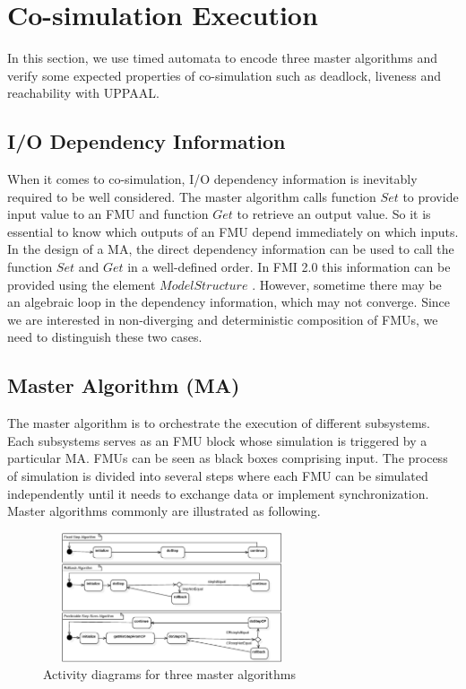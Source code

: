 \section{Co-simulation Execution}
\label{sec:ma}
In this section, we use timed automata to encode three master algorithms and verify some expected properties of co-simulation such as deadlock, liveness and reachability with UPPAAL.
\subsection{I/O Dependency Information}
When it comes to co-simulation, I/O dependency information \cite{BromanBGLMTW13} is inevitably required to be well considered. The master algorithm calls function $Set$ to provide input value to an FMU and function $Get$ to retrieve an output value. So it is essential to know which outputs of an FMU depend immediately on which inputs. In the design of a MA, the direct dependency information can be used to call the function $Set$ and $Get$ in a well-defined order. In FMI 2.0 this information can be provided using the element $ModelStructure$ \cite{FMI2INTRO}. However, sometime there may be an algebraic loop in the dependency information, which may not converge. Since we are interested in non-diverging and deterministic composition of FMUs, we need to distinguish these two cases. 
\subsection{Master Algorithm (MA)}
The master algorithm is to orchestrate the execution of different subsystems. Each subsystems serves as an FMU block whose simulation is triggered by a particular MA. FMUs can be seen as black boxes comprising input. The process of simulation is divided into several steps where each FMU can be simulated independently until it needs to exchange data or implement synchronization. Master algorithms commonly are illustrated as following.
\begin{figure}[htbp]
\begin{center}
\includegraphics[width=3.0in,height=1.5in]{fig/MA.jpg}
\caption{Activity diagrams for three master algorithms}
\label{ad-fixedstep}
\end{center}
\end{figure}
